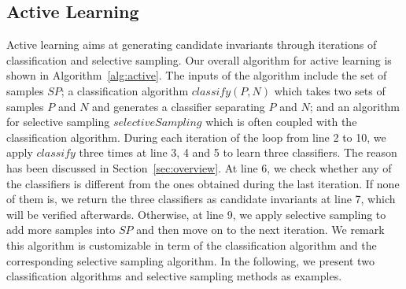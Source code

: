 
\subsection{Active Learning} %
\label{sec:activelearning}
Active learning aims at generating candidate invariants through iterations of classification and selective sampling. Our overall algorithm for active learning is shown in Algorithm~\ref{alg:active}. The inputs of the algorithm include the set of samples $\mathit{SP}$; a classification algorithm $\mathit{classify}(P,N)$ which takes two sets of samples $P$ and $N$ and generates a classifier separating $P$ and $N$; and an algorithm for selective sampling $\mathit{selectiveSampling}$ which is often coupled with the classification algorithm. During each iteration of the loop from line 2 to 10, we apply $\mathit{classify}$ three times at line 3, 4 and 5 to learn three classifiers. The reason has been discussed in Section~\ref{sec:overview}. At line 6, we check whether any of the classifiers is different from the ones obtained during the last iteration. If none of them is, we return the three classifiers as candidate invariants at line 7, which will be verified afterwards. Otherwise, at line 9, we apply selective sampling to add more samples into $\mathit{SP}$ and then move on to the next iteration. We remark this algorithm is customizable in term of the classification algorithm and the corresponding selective sampling algorithm. In the following, we present two classification algorithms and selective sampling methods as examples.


